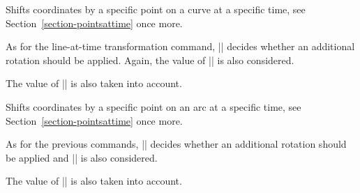 \begin{command}{\pgftransformcurveattime{}}
    Shifts coordinates by a specific point on a curve at a specific time, see
    Section~\ref{section-pointsattime} once more.

    As for the line-at-time transformation command, |\ifpgfslopedattime|
    decides whether an additional rotation should be applied. Again, the value
    of |\ifpgfallowupsidedownattime| is also considered.
\begin{codeexample}[]
\end{codeexample}
\begin{codeexample}[]
\end{codeexample}
    The value of |\ifpgfresetnontranslationsattime| is also taken into account.
\end{command}

\begin{command}{\pgftransformarcaxesattime{}%
}
    Shifts coordinates by a specific point on an arc at a specific time, see
    Section~\ref{section-pointsattime} once more.

    As for the previous commands, |\ifpgfslopedattime| decides whether an
    additional rotation should be applied and |\ifpgfallowupsidedownattime| is
    also considered.
\begin{codeexample}[]
\end{codeexample}
    The value of |\ifpgfresetnontranslationsattime| is also taken into account.
\end{command}

